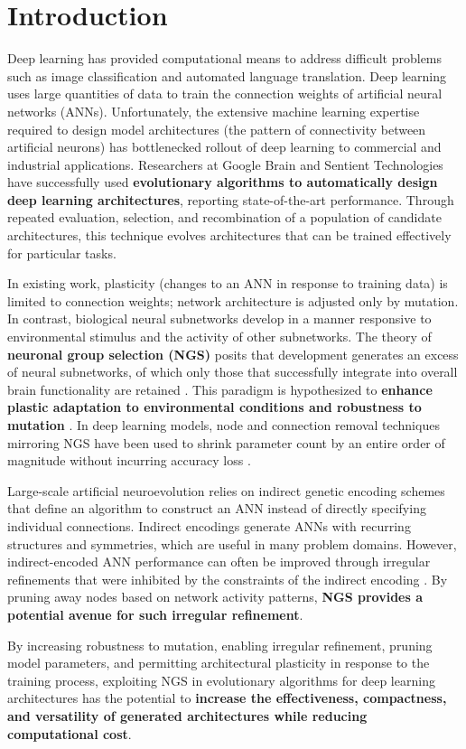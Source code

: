 \section{Introduction}

Deep learning has provided computational means to address difficult problems such as image classification and automated language translation.
Deep learning uses large quantities of data to train the connection weights of artificial neural networks (ANNs).
Unfortunately, the extensive machine learning expertise required to design model architectures (the pattern of connectivity between artificial neurons) has bottlenecked rollout of deep learning to commercial and industrial applications. Researchers at Google Brain \cite{real2017large} and Sentient Technologies \cite{miikkulainen2017evolving} have successfully used \textbf{evolutionary algorithms to automatically design deep learning architectures}, reporting state-of-the-art performance.
Through repeated evaluation, selection, and recombination of a population of candidate architectures, this technique evolves architectures that can be trained effectively for particular tasks.

In existing work, plasticity (changes to an ANN in response to training data) is limited to connection weights;
network architecture is adjusted only by mutation.
In contrast, biological neural subnetworks develop in a manner responsive to environmental stimulus and the activity of other subnetworks.
The theory of \textbf{neuronal group selection (NGS)} posits that development generates an excess of neural subnetworks, of which only those that successfully integrate into overall brain functionality are retained \cite{sanes2011development}.
This paradigm is hypothesized to \textbf{enhance plastic adaptation to environmental conditions and robustness to mutation} \cite{downing2015intelligence}.
In deep learning models, node and connection removal techniques mirroring NGS have been used to shrink parameter count by an entire order of magnitude without incurring accuracy loss \cite{song2015learning}.

Large-scale artificial neuroevolution relies on indirect genetic encoding schemes that define an algorithm to construct an ANN instead of directly specifying individual connections.
Indirect encodings generate ANNs with recurring structures and symmetries, which are useful in many problem domains.
However, indirect-encoded ANN performance can often be improved through irregular refinements that were inhibited by the constraints of the indirect encoding \cite{clune2011performance}.
By pruning away nodes based on network activity patterns, \textbf{NGS provides a potential avenue for such irregular refinement}.

By increasing robustness to mutation, enabling irregular refinement, pruning model parameters, and permitting architectural plasticity in response to the training process, exploiting NGS in evolutionary algorithms for deep learning architectures has the potential to \textbf{increase the effectiveness, compactness, and versatility of generated architectures while reducing computational cost}.
